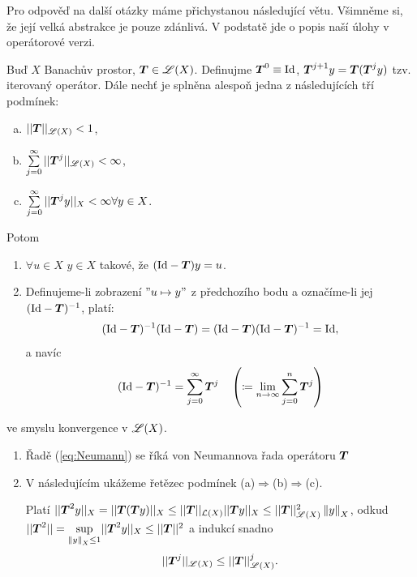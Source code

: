 Pro odpověď na další otázky máme přichystanou následující větu. Všimněme si, že její velká abstrakce je pouze zdánlivá. V podstatě jde o popis naší úlohy v operátorové verzi.


\begin{theorem}
\label{theorem:str14}
Buď $X$ Banachův prostor, $ \boldsymbol{T} \in\mathscr{L}(X)$. Definujme $ \boldsymbol{T} ^0\equiv \mathrm{Id}$, $ \boldsymbol{T} ^{j+1}y= \boldsymbol{T} ( \boldsymbol{T} ^jy)$ tzv. iterovaný operátor. Dále nechť je splněna alespoň jedna z následujících tří podmínek:
\begin{enumerate}[(a)]
    \item $|| \boldsymbol{T} ||_{\mathscr{L}(X)}<1$,
    \item $\sum\limits_{j=0}^\infty|| \boldsymbol{T} ^j||_{\mathscr{L}(X)}<\infty$,
    \item $\sum\limits_{j=0}^\infty|| \boldsymbol{T} ^jy||_X<\infty \forall y\in X$.
\end{enumerate}
Potom
\begin{enumerate}
    \item $\forall u \in X$  $y\in X$ takové, že $(\mathrm{Id}- \boldsymbol{T} )y=u$.
    \item Definujeme-li zobrazení $"u\mapsto y"$ z předchozího bodu a označíme-li jej $(\mathrm{Id}- \boldsymbol{T} )^{-1}$, platí:
    \begin{equation}
        (\mathrm{Id}- \boldsymbol{T} )^{-1}(\mathrm{Id}- \boldsymbol{T} ) = (\mathrm{Id}- \boldsymbol{T} )(\mathrm{Id}- \boldsymbol{T} )^{-1}=\mathrm{Id},
    \end{equation}
    a navíc
    \begin{equation}
        (\mathrm{Id}- \boldsymbol{T} )^{-1}=\sum\limits_{j=0}^\infty  \boldsymbol{T} ^j \quad \left(\coloneqq \underset{n\rightarrow\infty}{\lim} \sum\limits_{j=0}^{n}  \boldsymbol{T} ^j\right)
        \label{eq:Neumann}
    \end{equation}
\end{enumerate}
ve smyslu konvergence v $\mathscr{L}(X)$.
\end{theorem} 

\begin{remark} 
\begin{enumerate}
    \item Řadě (\ref{eq:Neumann}) se říká von Neumannova řada operátoru $ \boldsymbol{T} $
    \item V následujícím ukážeme řetězec podmínek (a)$\Rightarrow$(b)$\Rightarrow$(c).
    
    Platí $|| \boldsymbol{T} ^2y||_X = || \boldsymbol{T} ( \boldsymbol{T} y)||_X\leq|| \boldsymbol{T} ||_{\mathcal{L}(X)}|| \boldsymbol{T} y||_X\leq|| \boldsymbol{T} ||^2_{\mathscr{L}(X)}\left\lVert y\right\rVert_X$, odkud $|| \boldsymbol{T} ^2||=\underset{\left\lVert y\right\rVert_X\leq 1}{\sup}|| \boldsymbol{T} ^2y||_X\leq|| \boldsymbol{T} ||^2$ a indukcí snadno
    \begin{equation}
        || \boldsymbol{T} ^j||_{\mathscr{L}(X)}\leq || \boldsymbol{T} ||^j_{\mathscr{L}(X)}.
    \end{equation}
\end{enumerate}
\end{remark}

